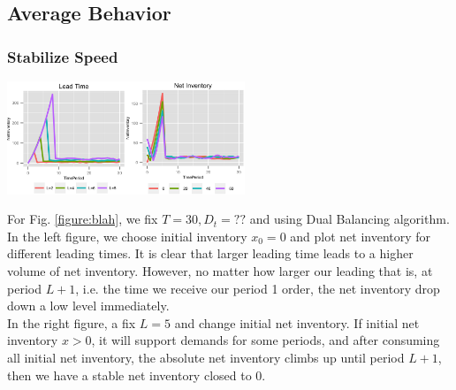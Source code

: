 \documentclass[twoside]{article}
\begin{document}
\begin{multicols}{2}
\subsection{Average Behavior}

\subsubsection{Stabilize Speed}
\begin{center}
  \includegraphics[width=2.8in]{figures/NetInventoryLeadTime.png}
\end{center}

For Fig. \ref{figure:blah}, we fix $T=30, D_t=??$ and using Dual Balancing algorithm. In the left figure, we choose initial inventory $x_0 = 0$ and plot net inventory for different leading times. It is clear that larger leading time leads to a higher volume of net inventory. However, no matter how larger our leading that is, at period $L+1$, i.e. the time we receive our period 1 order, the net inventory drop down a low level immediately.\\
In the right figure, a fix $L = 5$ and change initial net inventory. If initial net inventory $x > 0$, it will support demands for some periods, and after consuming all initial net inventory, the absolute net inventory climbs up until period $L+1$, then we have a stable net inventory closed to 0.\\


\end{multicols}
\end{document}
